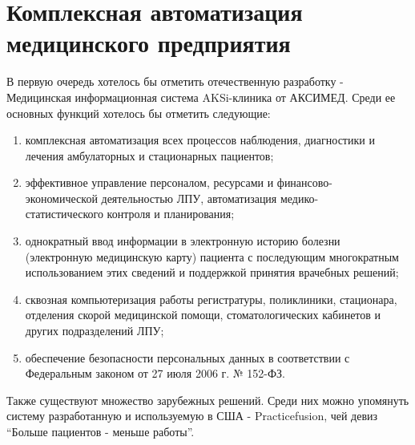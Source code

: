 \section{Комплексная автоматизация медицинского предприятия}
В первую очередь хотелось бы отметить отечественную разработку - Медицинская
информационная система AKSi-клиника от АКСИМЕД. Среди ее основных функций
хотелось бы отметить следующие:

\begin{enumerate}
  \item комплексная автоматизация всех процессов наблюдения, диагностики и
  лечения амбулаторных и стационарных пациентов;
  \item эффективное управление персоналом, ресурсами и
  финансово-\\экономической деятельностью ЛПУ, автоматизация
  медико-\\статистического контроля и планирования;
  \item однократный ввод информации в электронную историю болезни (электронную
  медицинскую карту) пациента с последующим многократным использованием этих сведений и поддержкой принятия врачебных решений;
  \item сквозная компьютеризация работы регистратуры, поликлиники, стационара,
  отделения скорой медицинской помощи, стоматологических кабинетов и других подразделений ЛПУ;
  \item обеспечение безопасности персональных данных в соответствии с
  Федеральным законом от 27 июля 2006 г. № 152-ФЗ.
\end{enumerate}

Также существуют множество зарубежных решений. Среди них можно упомянуть систему
разработанную и используемую в США - Practicefusion, чей девиз “Больше пациентов
- меньше работы”.





